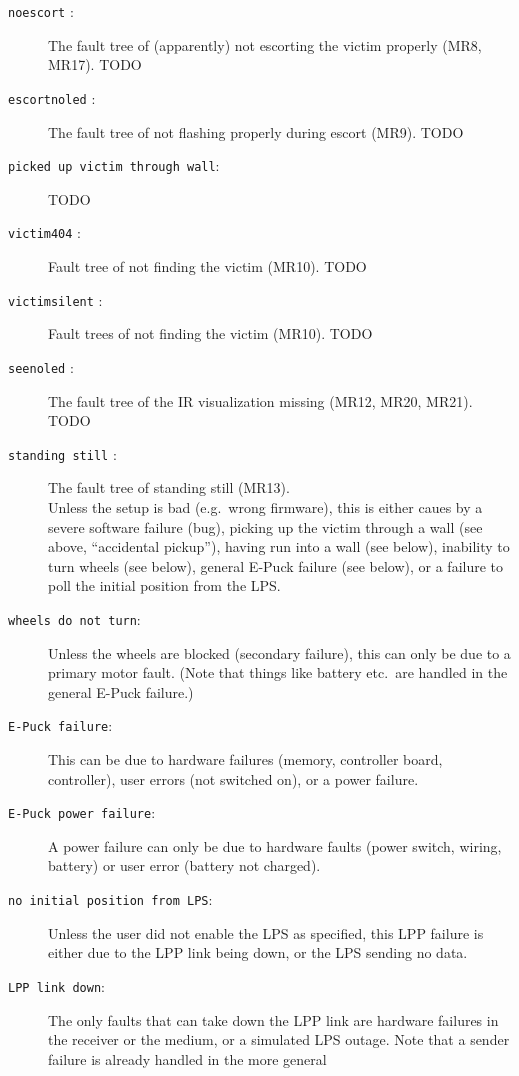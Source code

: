 \documentclass[a4paper,parskip,headheight=38pt]{scrartcl} %
\begin{document}
\begin{description}
\item[\texttt{noescort} :]
    The fault tree of (apparently) not escorting the victim properly
    (MR8, MR17). TODO
\item[\texttt{escortnoled} :]
    The fault tree of not flashing properly during escort (MR9). TODO
\item[\texttt{picked up victim through wall}:]
    TODO
\item[\texttt{victim404} :]
    Fault tree of not finding the victim (MR10). TODO
\item[\texttt{victimsilent} :]
    Fault trees of not finding the victim (MR10). TODO
\item[\texttt{seenoled} :]
    The fault tree of the IR visualization missing (MR12, MR20, MR21). TODO
\item[\texttt{standing still} :]
    The fault tree of standing still (MR13).
     \\
    Unless the setup is bad (e.g.\ wrong firmware), this is either
    caues by a severe software failure (bug), picking up the victim
    through a wall (see above, \enquote{accidental pickup}),
    having run into a wall (see below),
    inability to turn wheels (see below), general E-Puck failure (see
    below), or a failure to poll the initial position from the LPS.
\item[\texttt{wheels do not turn}:]
    Unless the wheels are blocked (secondary failure), this can only be
    due to a primary motor fault. (Note that things like battery etc.\
    are handled in the general E-Puck failure.)
\item[\texttt{E-Puck failure}:]
    This can be due to hardware failures (memory, controller board,
    controller), user errors (not switched on), or a power failure.
\item[\texttt{E-Puck power failure}:]
    A power failure can only be due to hardware faults (power switch,
    wiring, battery) or user error (battery not charged).
\item[\texttt{no initial position from LPS}:]
    Unless the user did not enable the LPS as specified, this LPP
    failure is either due to the LPP link being down, or the LPS
    sending no data.
\item[\texttt{LPP link down}:]
    The only faults that can take down the LPP link are hardware
    failures in the receiver or the medium, or a simulated LPS outage.
    Note that a sender failure is already handled in the more general

\end{description}
\end{document}
